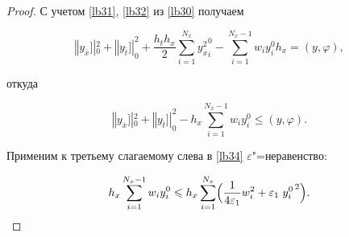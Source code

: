 \begin{proof}





С учетом \eqref{lb31}, \eqref{lb32} из \eqref{lb30} получаем

\begin{equation}

\label{lb33}

\left\Vert y_{\overline{x}}\right.]|_{0}^{2}+\left\Vert y_{\overline{t}}\right.]|_{0}^{2}+\frac{h_t h_x}{2} \sum\limits_{i=1}^{N_x}\left.y_{\overline{x}}^2\right._{i}^{0}-\sum\limits_{i=1}^{N_x-1} w_i y_{i}^{0} h_x=(y,\varphi),

\end{equation}

откуда 

\begin{equation}

\label{lb34}

\left\Vert y_{\overline{x}}\right.]|_{0}^{2}+\left\Vert y_{\overline{t}}\right.]|_{0}^{2}-h_x\sum\limits_{i=1}^{N_x-1} w_i y_{i}^{0}\leqslant (y,\varphi).

\end{equation}

Применим к третьему слагаемому слева в \eqref{lb34} $\varepsilon$"=неравенство: 

\begin{equation}

\label{lb35}

h_x\sum\limits_{i=1}^{N_x-1} w_i y_{i}^{0} \leqslant

h_x \sum\limits_{i=1}^{N_x} \Bigl(\frac{1}{4\varepsilon_1} w_{i}^{2}+\varepsilon_1 \left.y_{i}^{0}\right.^2\Bigr).

\end{equation}





\end{proof}
